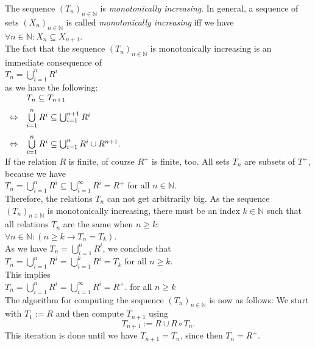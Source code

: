 The sequence  $(T_n)_{n\in\mathbb{N}}$ is \emph{monotonically increasing}.  In general, a
sequence of sets $(X_n)_{n\in\mathbb{N}}$ is called \emph{monotonically increasing} iff we
have
\\[0.2cm]
\hspace*{1.3cm}
$\forall n \in \mathbb{N}: X_n \subseteq X_{n+1}$.
\\[0.2cm]
The fact that the sequence $(T_n)_{n\in\mathbb{N}}$ is monotonically increasing is an
immediate consequence of
\\[0.2cm]
\hspace*{1.3cm}
$T_n = \bigcup_{i=1}^{n} R^i$
\\[0.2cm]
as we have the following:
\\[0.2cm]
\hspace*{1.3cm}
$
\begin{array}[t]{llcl}
                & T_n \subseteq T_{n+1} \\[0.2cm]
\Leftrightarrow & \bigcup\limits_{i=1}^{n} R^i \subseteq \bigcup_{i=1}^{n+1} R^i \\[0.5cm]
\Leftrightarrow & \bigcup\limits_{i=1}^{n} R^i \subseteq \bigcup_{i=1}^{n} R^i \cup R^{n+1}. \\
\end{array}
$
\\[0.2cm]
If the relation $R$ is finite, of course  $R^+$ is finite, too.  All sets  $T_n$ are 
subsets of $T^+$, because we have 
\\[0.2cm]
\hspace*{1.3cm}
$T_n = \bigcup\limits_{i=1}^{n} R^i \subseteq \bigcup\limits_{i=1}^{\infty} R^i = R^+$ \quad for all $n \in \mathbb{N}$.
\\[0.2cm]
Therefore, the relations  $T_n$ can not get arbitrarily big.  As the sequence 
$(T_n)_{n\in\mathbb{N}}$ is monotonically increasing, there must be an index $k \in \mathbb{N}$ such that
all relations  $T_n$ are the same when $n \geq k$:
\\[0.2cm]
\hspace*{1.3cm}
$\forall n \in \mathbb{N}:( n \geq k \rightarrow T_n = T_k)$.
\\[0.2cm]
As we have $T_n = \bigcup_{i=1}^{n} R^i$, we conclude that
\\[0.2cm]
\hspace*{1.3cm}
$T_n = \bigcup\limits_{i=1}^{n} R^i = \bigcup\limits_{i=1}^{k} R^i = T_k$ \quad for all $n \geq k$.
\\[0.2cm]
This implies
\\[0.2cm]
\hspace*{1.3cm}
$T_n = \bigcup\limits_{i=1}^{n} R^i = \bigcup\limits_{i=1}^{\infty} R^i = R^+$. 
\quad for all $n \geq k$  
\\[0.2cm]
The algorithm for computing the sequence $(T_n)_{n \in \mathbb{N}}$ is now as follows:  
We start with $T_1 := R$ and then compute $T_{n+1}$ using
\[ T_{n+1} := R \cup R \circ T_n. \]
This iteration is done until we have $T_{n+1} = T_n$, since then $T_n = R^+$.


